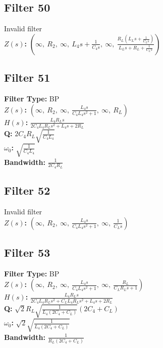 \documentclass{article}
\begin{document}
\subsection*{Filter 50}
Invalid filter \\ 
\textbf{$Z(s)$:} $\left( \infty, \  R_{2}, \  \infty, \  L_{4} s + \frac{1}{C_{4} s}, \  \infty, \  \frac{R_{L} \left(L_{L} s + \frac{1}{C_{L} s}\right)}{L_{L} s + R_{L} + \frac{1}{C_{L} s}}\right)$ \\ 
\subsection*{Filter 51}
\textbf{Filter Type:} BP \\ 
\textbf{$Z(s)$:} $\left( \infty, \  R_{2}, \  \infty, \  \frac{L_{4} s}{C_{4} L_{4} s^{2} + 1}, \  \infty, \  R_{L}\right)$ \\ 
\textbf{$H(s)$:} $\frac{L_{4} R_{L} s}{2 C_{4} L_{4} R_{L} s^{2} + L_{4} s + 2 R_{L}}$ \\ 
\textbf{Q:} $2 C_{4} R_{L} \sqrt{\frac{1}{C_{4} L_{4}}}$ \\ 
\textbf{$\omega_0$:} $\sqrt{\frac{1}{C_{4} L_{4}}}$ \\ 
\textbf{Bandwidth:} $\frac{1}{2 C_{4} R_{L}}$ \\ 
\subsection*{Filter 52}
Invalid filter \\ 
\textbf{$Z(s)$:} $\left( \infty, \  R_{2}, \  \infty, \  \frac{L_{4} s}{C_{4} L_{4} s^{2} + 1}, \  \infty, \  \frac{1}{C_{L} s}\right)$ \\ 
\subsection*{Filter 53}
\textbf{Filter Type:} BP \\ 
\textbf{$Z(s)$:} $\left( \infty, \  R_{2}, \  \infty, \  \frac{L_{4} s}{C_{4} L_{4} s^{2} + 1}, \  \infty, \  \frac{R_{L}}{C_{L} R_{L} s + 1}\right)$ \\ 
\textbf{$H(s)$:} $\frac{L_{4} R_{L} s}{2 C_{4} L_{4} R_{L} s^{2} + C_{L} L_{4} R_{L} s^{2} + L_{4} s + 2 R_{L}}$ \\ 
\textbf{Q:} $\sqrt{2} R_{L} \sqrt{\frac{1}{L_{4} \left(2 C_{4} + C_{L}\right)}} \left(2 C_{4} + C_{L}\right)$ \\ 
\textbf{$\omega_0$:} $\sqrt{2} \sqrt{\frac{1}{L_{4} \left(2 C_{4} + C_{L}\right)}}$ \\ 
\textbf{Bandwidth:} $\frac{1}{R_{L} \left(2 C_{4} + C_{L}\right)}$ \\ 
\end{document}
